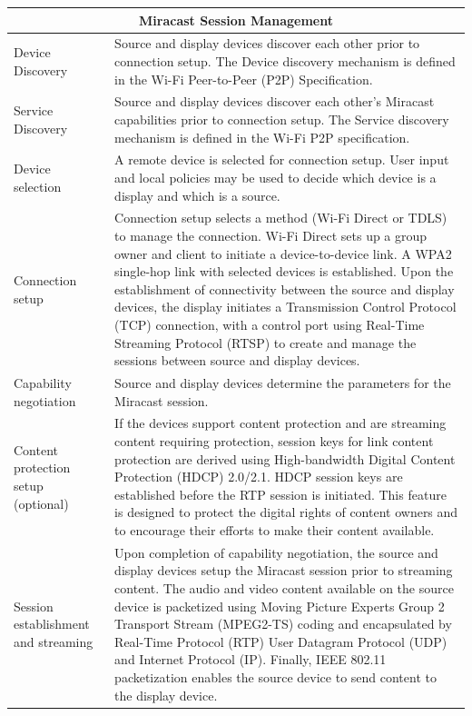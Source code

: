 \begin{center} 
    \begin{tabular}{ | p{3.5cm} | p{10cm} |} 
     \hline 
    \multicolumn{2}{c}{Miracast Session Management}\\ 
    \hline 
    Device Discovery  & Source and display devices discover each other prior to 
    connection setup. The Device discovery mechanism is defined in the Wi-Fi 
    Peer-to-Peer (P2P) Specification. \\ \hline 
    
    Service Discovery  & Source and display devices discover each other's 
    Miracast capabilities prior to connection setup. The Service discovery 
    mechanism is defined in the Wi-Fi P2P specification. \\ \hline 
    
    Device selection &A remote device is selected for connection setup. User 
    input and local policies may be used to decide which device is a display 
    and which is a source. \\ \hline 
    
    Connection setup & Connection setup selects a method (Wi-Fi Direct or TDLS) 
    to manage the connection. Wi-Fi Direct sets up a group owner and client to 
    initiate a device-to-device link. A WPA2 single-hop link with selected 
    devices is established. Upon the establishment of connectivity between the 
    source and display devices, the display initiates a Transmission Control 
    Protocol (TCP) connection, with a control port using Real-Time Streaming 
    Protocol (RTSP) to create and manage the sessions between source and 
    display devices. \\ 
    \hline 
    
    Capability negotiation & Source and display devices determine the parameters 
    for the Miracast session. \\ \hline 
    
    Content protection setup (optional) & If the devices support content 
    protection and are streaming content requiring protection, session keys for 
    link content protection are derived using High-bandwidth Digital Content 
    Protection (HDCP) 2.0/2.1. HDCP session keys are established before the RTP 
    session is initiated. This feature is designed to protect the digital 
    rights of content owners and to encourage their efforts to make their 
    content available. \\ \hline 
    
    Session establishment and streaming & Upon completion of capability 
    negotiation, the source and display devices setup the Miracast session 
    prior to streaming content. 
    The audio and video content available on the source device is packetized 
    using Moving Picture Experts Group 2 Transport Stream (MPEG2-TS) coding and 
    encapsulated by Real-Time Protocol (RTP) User Datagram Protocol (UDP) and 
    Internet Protocol (IP). Finally, IEEE 802.11 packetization enables the 
    source device to send content to the display device. \\ \hline 
    

\end{tabular}
\end{center}
